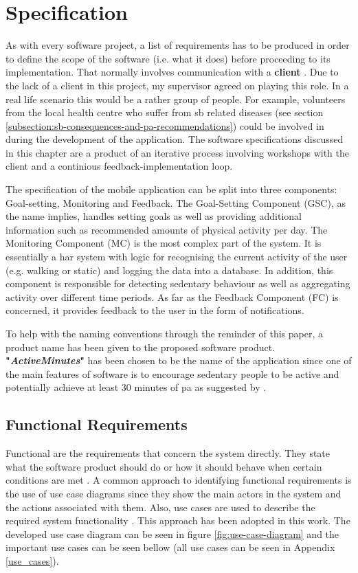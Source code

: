 \chapter{Specification}
\label{Chapter:Specification}

As with every software project, a list of requirements has to be produced in order to define the scope of the software (i.e. what it does) before proceeding to its implementation. That normally involves communication with a \textbf{client} \citep[23]{bell2005}. Due to the lack of a client in this project, my supervisor agreed on playing this role. In a real life scenario this would be a rather group of people. For example, volunteers from the local health centre who suffer from \gls{sb} related diseases (see section \ref{subsection:sb-consequences-and-pa-recommendations}) could be involved in during the development of the application. The software specifications discussed in this chapter are a product of an iterative process involving workshops with the client and a continious feedback-implementation loop.

The specification of the mobile application can be split into three components: Goal-setting, Monitoring and Feedback. The Goal-Setting Component (GSC), as the name implies, handles setting goals as well as providing additional information such as recommended amounts of physical activity per day. The Monitoring Component (MC) is the most complex part of the system. It is essentially a \gls{har} system with logic for recognising the current activity of the user (e.g. walking or static) and logging the data into a database. In addition, this component is responsible for detecting sedentary behaviour as well as aggregating activity over different time periods. As far as the Feedback Component (FC) is concerned, it provides feedback to the user in the form of notifications.

To help with the naming conventions through the reminder of this paper, a product name has been given to the proposed software product. \textbf{"\textit{ActiveMinutes}"} has been chosen to be the name of the application since one of the main features of software is to encourage sedentary people to be active and potentially achieve at least 30 minutes of \gls{pa} as suggested by \citet[7]{departmentofhealth2011}.

\section{Functional Requirements}
    Functional are the requirements that concern the system directly. They state what the software product should do or how it should behave when certain conditions are met \citep[84]{sommerville2010}. A common approach to identifying functional requirements is the use of use case diagrams since they show the main actors in the system and the actions associated with them. Also, use cases are used to describe the required system functionality \citep[45-47]{bell2005}. This approach has been adopted in this work. The developed use case diagram can be seen in figure \ref{fig:use-case-diagram} and the important use cases can be seen bellow (all use cases can be seen in Appendix \ref{use_cases}).
    
